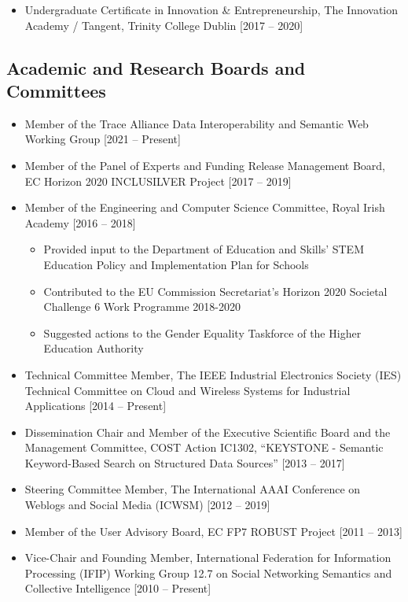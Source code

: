 \documentclass[10pt,a4paper]{res} %
\begin{document}
\begin{resume}
\begin{itemize} \itemsep -2pt
\item Undergraduate Certificate in Innovation \& Entrepreneurship, The Innovation Academy / Tangent, Trinity College Dublin [2017 -- 2020]
\end{itemize}

\subsection*{Academic and Research Boards and Committees}
\begin{itemize} \itemsep -2pt
\item Member of the Trace Alliance Data Interoperability and Semantic Web Working Group [2021 -- Present]
\item Member of the Panel of Experts and Funding Release Management Board, EC Horizon 2020 INCLUSILVER Project [2017 -- 2019]
\item Member of the Engineering and Computer Science Committee, Royal Irish Academy [2016 -- 2018]
\begin{itemize} \itemsep -2pt
\item Provided input to the Department of Education and Skills' STEM Education Policy and Implementation Plan for Schools
\item Contributed to the EU Commission Secretariat's Horizon 2020 Societal Challenge 6 Work Programme 2018-2020
\item Suggested actions to the Gender Equality Taskforce of the Higher Education Authority
\end{itemize}
\item Technical Committee Member, The IEEE Industrial Electronics Society (IES) Technical Committee on Cloud and Wireless Systems for Industrial Applications [2014 -- Present]
\item Dissemination Chair and Member of the Executive Scientific Board and the Management Committee, COST Action IC1302, ``KEYSTONE - Semantic Keyword-Based Search on Structured Data Sources'' [2013 -- 2017]
\item Steering Committee Member, The International AAAI Conference on Weblogs and Social Media (ICWSM) [2012 -- 2019]
\item Member of the User Advisory Board, EC FP7 ROBUST Project [2011 -- 2013]
\item Vice-Chair and Founding Member, International Federation for Information Processing (IFIP) Working Group 12.7 on Social Networking Semantics and Collective Intelligence [2010 -- Present]
\end{itemize}


\end{resume}
\end{document}
